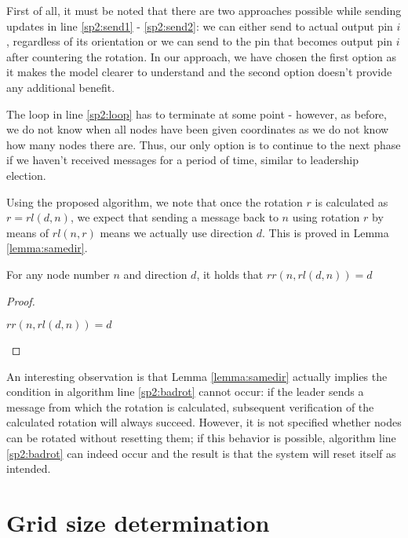 First of all, it must be noted that there are two approaches possible while sending updates in line \ref{sp2:send1} - \ref{sp2:send2}: we can either send to actual output pin $i$, regardless of its orientation or we can send to the pin that becomes output pin $i$ after countering the rotation. In our approach, we have chosen the first option as it makes the model clearer to understand and the second option doesn't provide any additional benefit.

The loop in line \ref{sp2:loop} has to terminate at some point - however, as before, we do not know when all nodes have been given coordinates as we do not know how many nodes there are. Thus, our only option is to continue to the next phase if we haven't received messages for a period of time, similar to leadership election.

Using the proposed algorithm, we note that once the rotation $r$ is calculated as $r = rl(d,n)$, we expect that sending a message back to $n$ using rotation $r$ by means of $rl(n,r)$ means we actually use direction $d$. This is proved in Lemma \ref{lemma:samedir}.
\\
\begin{lemma} \label{lemma:samedir} For any node number $n$ and direction $d$, it holds that $rr(n, rl(d,n)) = d$ \end{lemma}
\begin{proof}
\begin{derivation}{$rr(n, rl(d,n)) = d$}
\end{derivation}
\end{proof}

An interesting observation is that Lemma \ref{lemma:samedir} actually implies the condition in algorithm line \ref{sp2:badrot} cannot occur: if the leader sends a message from which the rotation is calculated, subsequent verification of the calculated rotation will always succeed. However, it is not specified whether nodes can be rotated without resetting them; if this behavior is possible, algorithm line \ref{sp2:badrot} can indeed occur and the result is that the system will reset itself as intended.

\section{Grid size determination}
\label{sec:opgridsize}

